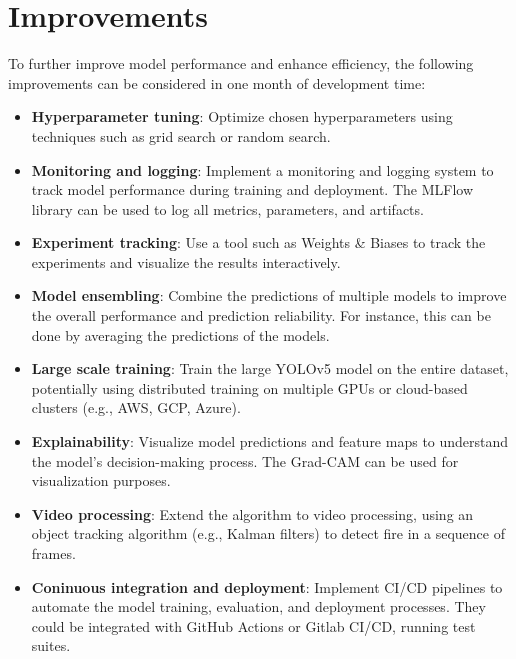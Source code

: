 \documentclass{article}
\begin{document}
\newpage

\section{Improvements}

To further improve model performance and enhance efficiency, the following improvements can be considered in one month of development time:

\begin{itemize}
    \item \textbf{Hyperparameter tuning}: Optimize chosen hyperparameters using techniques such as grid search or random search.
    \item \textbf{Monitoring and logging}: Implement a monitoring and logging system to track model performance during training and deployment. The MLFlow library can be used to log all metrics, parameters, and artifacts.
    \item \textbf{Experiment tracking}: Use a tool such as Weights \& Biases to track the experiments and visualize the results interactively.
    \item \textbf{Model ensembling}: Combine the predictions of multiple models to improve the overall performance and prediction reliability.  For instance, this can be done by averaging the predictions of the models.
    \item \textbf{Large scale training}: Train the large YOLOv5 model on the entire dataset, potentially using distributed training on multiple GPUs or cloud-based clusters (e.g., AWS, GCP, Azure).
    \item \textbf{Explainability}: Visualize model predictions and feature maps to understand the model's decision-making process. The Grad-CAM can be used for visualization purposes.
    \item \textbf{Video processing}: Extend the algorithm to video processing, using an object tracking algorithm (e.g., Kalman filters) to detect fire in a sequence of frames.
    \item \textbf{Coninuous integration and deployment}: Implement CI/CD pipelines to automate the model training, evaluation, and deployment processes. They could be integrated with GitHub Actions or Gitlab CI/CD, running test suites.
\end{itemize}
\end{document}
